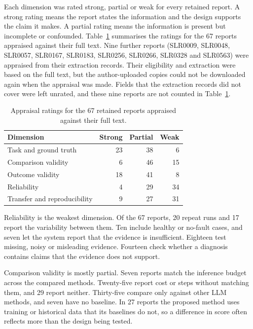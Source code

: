 Each dimension was rated strong, partial or weak for every retained report.
A strong rating means the report states the information and the design
supports the claim it makes. A partial rating means the information is
present but incomplete or confounded. Table~\ref{tab:slr:appraisal}
summarises the ratings for the 67 reports appraised against their full
text. Nine further reports (SLR0009, SLR0048, SLR0057, SLR0167, SLR0183,
SLR0256, SLR0266, SLR0328 and SLR0563) were appraised from their
extraction records. Their eligibility and extraction were based on the
full text, but the author-uploaded copies could not be downloaded again
when the appraisal was made. Fields that the extraction records did not
cover were left unrated, and these nine reports are not counted in
Table~\ref{tab:slr:appraisal}.

\begin{table}[htbp]
\centering\small
\caption{Appraisal ratings for the 67 retained reports appraised against
their full text.}
\label{tab:slr:appraisal}
\begin{tabularx}{\textwidth}{@{}Xrrr@{}}
\toprule
Dimension & Strong & Partial & Weak \\
\midrule
Task and ground truth & 23 & 38 & 6 \\
Comparison validity & 6 & 46 & 15 \\
Outcome validity & 18 & 41 & 8 \\
Reliability & 4 & 29 & 34 \\
Transfer and reproducibility & 9 & 27 & 31 \\
\bottomrule
\end{tabularx}
\end{table}

Reliability is the weakest dimension. Of the 67 reports, 20 repeat runs
and 17 report the variability between them. Ten include healthy or
no-fault cases, and seven let the system report that the evidence is
insufficient. Eighteen test missing, noisy or misleading evidence.
Fourteen check whether a diagnosis contains claims that the evidence does
not support.

Comparison validity is mostly partial. Seven reports match the inference
budget across the compared methods. Twenty-five report cost or steps
without matching them, and 29 report neither. Thirty-five compare only
against other LLM methods, and seven have no baseline. In 27 reports the
proposed method uses training or historical data that its baselines do not,
so a difference in score often reflects more than the design being tested.

